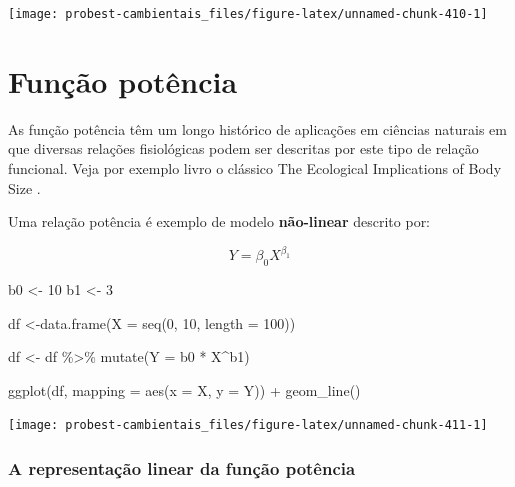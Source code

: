 \documentclass[
]{book}
\newenvironment{Shaded}{\begin{snugshade}}{\end{snugshade}}
\newcommand{\AttributeTok}[1]{\textcolor[rgb]{0.77,0.63,0.00}{#1}}
\newcommand{\DecValTok}[1]{\textcolor[rgb]{0.00,0.00,0.81}{#1}}
\newcommand{\FunctionTok}[1]{\textcolor[rgb]{0.00,0.00,0.00}{#1}}
\newcommand{\NormalTok}[1]{#1}
\newcommand{\OtherTok}[1]{\textcolor[rgb]{0.56,0.35,0.01}{#1}}
\newcommand{\SpecialCharTok}[1]{\textcolor[rgb]{0.00,0.00,0.00}{#1}}
\begin{document}
\begin{center}\texttt{[image: probest-cambientais\_files/figure-latex/unnamed-chunk-410-1]} \end{center}

\hypertarget{funuxe7uxe3o-potuxeancia}{%
\section{Função potência}\label{funuxe7uxe3o-potuxeancia}}

As função potência têm um longo histórico de aplicações em ciências naturais em que diversas relações fisiológicas podem ser descritas por este tipo de relação funcional. Veja por exemplo livro o clássico The Ecological Implications of Body Size \citep{peters1986ecological}.

Uma relação potência é exemplo de modelo \textbf{não-linear} descrito por:

\[Y = \beta_{0}X^{\beta_{1}}\]

\begin{Shaded}
\begin{Highlighting}[]
\NormalTok{b0 }\OtherTok{\textless{}{-}} \DecValTok{10}
\NormalTok{b1 }\OtherTok{\textless{}{-}} \DecValTok{3}

\NormalTok{df }\OtherTok{\textless{}{-}}\FunctionTok{data.frame}\NormalTok{(}\AttributeTok{X =} \FunctionTok{seq}\NormalTok{(}\DecValTok{0}\NormalTok{, }\DecValTok{10}\NormalTok{, }\AttributeTok{length =} \DecValTok{100}\NormalTok{))}

\NormalTok{df }\OtherTok{\textless{}{-}}\NormalTok{ df }\SpecialCharTok{\%\textgreater{}\%} \FunctionTok{mutate}\NormalTok{(}\AttributeTok{Y =}\NormalTok{ b0 }\SpecialCharTok{*}\NormalTok{ X}\SpecialCharTok{\^{}}\NormalTok{b1)}

\FunctionTok{ggplot}\NormalTok{(df, }\AttributeTok{mapping =} \FunctionTok{aes}\NormalTok{(}\AttributeTok{x =}\NormalTok{ X, }\AttributeTok{y =}\NormalTok{ Y)) }\SpecialCharTok{+}
  \FunctionTok{geom\_line}\NormalTok{()}
\end{Highlighting}
\end{Shaded}

\begin{center}\texttt{[image: probest-cambientais\_files/figure-latex/unnamed-chunk-411-1]} \end{center}

\hypertarget{a-representauxe7uxe3o-linear-da-funuxe7uxe3o-potuxeancia}{%
\subsubsection*{A representação linear da função potência}\label{a-representauxe7uxe3o-linear-da-funuxe7uxe3o-potuxeancia}}
\end{document}
